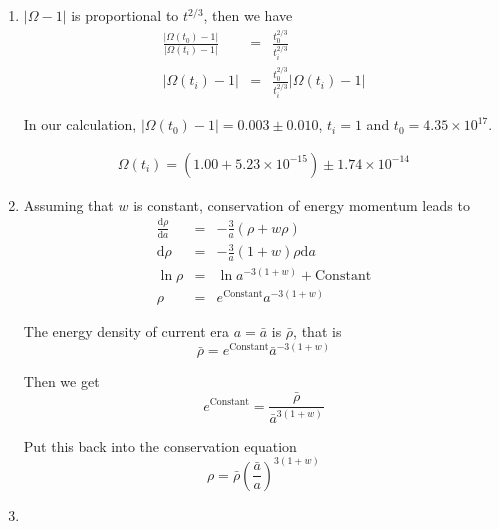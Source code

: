 \documentclass[12pt,a4paper]{article}
\begin{document}
\begin{enumerate}
\item

$\vert \Omega - 1 \vert$ is proportional to $t^{2/3}$, then we have
\begin{eqnarray*}
	\frac{\vert \Omega(t_0)- 1 \vert}{\vert \Omega(t_i)-1  \vert} &=& \frac{t_0^{2/3}}{t_i^{2/3}} \\
	\vert \Omega (t_i) - 1 \vert &=& \frac{t_0^{2/3}}{t_i^{2/3}}\vert \Omega(t_i)-1  \vert
\end{eqnarray*}


In our calculation, $\vert\Omega(t_0)-1\vert = 0.003 \pm 0.010$, $t_i=1$ and $t_0 = 4.35\times 10^{17}$.

\begin{eqnarray*}
	\Omega (t_i)  = (1.00 + 5.23\times 10^{-15} )\pm 1.74\times 10^{-14}
\end{eqnarray*}






\item

Assuming that $w$ is constant, conservation of energy momentum leads to
\begin{eqnarray*}
	\frac{\mathrm d\rho}{\mathrm d a} &=& -\frac{3}{a}(\rho + w\rho) \\
	\mathrm d\rho &=& -\frac{3}{a} (1+w) \rho \mathrm da \\
	\ln\rho &=& \ln a^{-3(1+w)} + \mathrm{Constant}  \\
	\rho &=& e^{\mathrm{Constant}}a^{-3(1+w)}
\end{eqnarray*}

The energy density of current era $a=\bar a$ is $\bar\rho$, that is
\begin{equation*}
	\bar \rho = e^{\mathrm{Constant}} {\bar a}^{-3(1+w)}
\end{equation*}

Then we get
\begin{equation*}
	e^{\mathrm{Constant}} = \frac{\bar \rho}{{\bar a}^{3(1+w)}}
\end{equation*}

Put this back into the conservation equation
\begin{equation*}
	\rho = \bar\rho \left( \frac{\bar a}{a} \right)^{3(1+w)}
\end{equation*}




\item



\end{enumerate}
\end{document}
